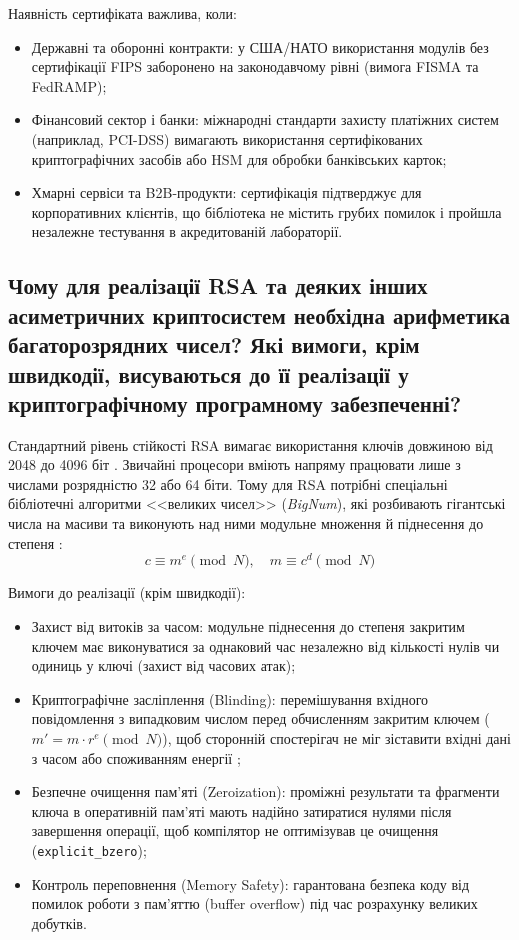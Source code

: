 Наявність сертифіката важлива, коли:
\begin{itemize}
    \item Державні та оборонні контракти: у США/НАТО використання модулів без сертифікації FIPS заборонено на законодавчому рівні (вимога FISMA та FedRAMP);
    \item Фінансовий сектор і банки: міжнародні стандарти захисту платіжних систем (наприклад, PCI-DSS) вимагають використання сертифікованих криптографічних засобів або HSM для обробки банківських карток;
    \item Хмарні сервіси та B2B-продукти: сертифікація підтверджує для корпоративних клієнтів, що бібліотека не містить грубих помилок і пройшла незалежне тестування в акредитованій лабораторії.
\end{itemize}


\subsection{Чому для реалізації RSA та деяких інших асиметричних криптосистем необхідна арифметика багаторозрядних чисел? Які вимоги, крім швидкодії, висуваються до її реалізації у криптографічному програмному забезпеченні?}

Стандартний рівень стійкості RSA вимагає використання ключів довжиною від 2048 до 4096 біт \cite{SP800-57}. Звичайні процесори вміють напряму працювати лише з числами розрядністю 32 або 64 біти. Тому для RSA потрібні спеціальні бібліотечні алгоритми <<великих чисел>> (\textit{BigNum}), які розбивають гігантські числа на масиви та виконують над ними модульне множення й піднесення до степеня \cite{RFC8017}:
\begin{equation}
c \equiv m^e \pmod{N}, \quad m \equiv c^d \pmod{N}
\end{equation}

Вимоги до реалізації (крім швидкодії):
\begin{itemize}
    \item Захист від витоків за часом: модульне піднесення до степеня закритим ключем має виконуватися за однаковий час незалежно від кількості нулів чи одиниць у ключі (захист від часових атак);
    \item Криптографічне засліплення (Blinding): перемішування вхідного повідомлення з випадковим числом перед обчисленням закритим ключем ($m' = m \cdot r^e \pmod{N}$), щоб сторонній спостерігач не міг зіставити вхідні дані з часом або споживанням енергії \cite{RFC8017};
    \item Безпечне очищення пам'яті (Zeroization): проміжні результати та фрагменти ключа в оперативній пам'яті мають надійно затиратися нулями після завершення операції, щоб компілятор не оптимізував це очищення (\texttt{explicit\_bzero});
    \item Контроль переповнення (Memory Safety): гарантована безпека коду від помилок роботи з пам'яттю (buffer overflow) під час розрахунку великих добутків.
\end{itemize}
